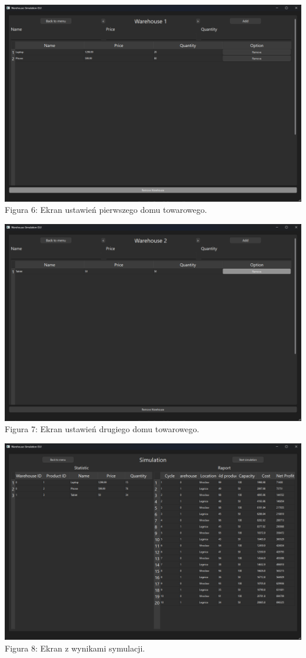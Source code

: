 \documentclass[11pt]{article}
\begin{document}
\begin{center}
    \includegraphics[scale=0.45]{warehouse1.png}
    Figura 6: Ekran ustawień pierwszego domu towarowego.
\end{center}
\begin{center}
    \includegraphics[scale=0.45]{warehouse2.png}
    Figura 7: Ekran ustawień drugiego domu towarowego.
\end{center}
\begin{center}
    \includegraphics[scale=0.45]{wyniki.png}
    Figura 8: Ekran z wynikami symulacji.
\end{center}
\end{document}
